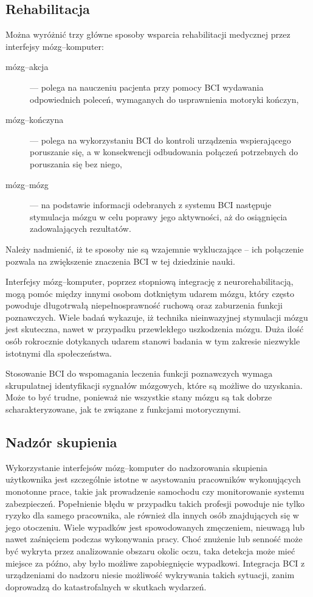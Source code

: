 \documentclass[skorowidz,skroty]{dyplomWEZUT}
\begin{document}
\subsection{Rehabilitacja}
Można wyróżnić trzy główne sposoby wsparcia rehabilitacji medycznej przez interfejsy mózg--komputer\cite{bci_lab}:
\begin{description}
    \item [mózg--akcja] --- polega na nauczeniu pacjenta przy pomocy BCI wydawania odpowiednich poleceń, wymaganych do usprawnienia motoryki kończyn,
    \item [mózg--kończyna] --- polega na wykorzystaniu BCI do kontroli urządzenia wspierającego poruszanie się, a w konsekwencji odbudowania połączeń potrzebnych do poruszania się bez niego,
    \item [mózg--mózg] --- na podstawie informacji odebranych z systemu BCI następuje stymulacja mózgu w celu poprawy jego aktywności, aż do osiągnięcia zadowalających rezultatów.
\end{description}
Należy nadmienić, iż te sposoby nie są wzajemnie wykluczające -- ich połączenie pozwala na zwiększenie znaczenia BCI w tej dziedzinie nauki.

Interfejsy mózg--komputer, poprzez stopniową integrację z neurorehabilitacją, mogą pomóc między innymi osobom dotkniętym udarem mózgu, który często powoduje długotrwałą niepełnosprawność ruchową oraz zaburzenia funkcji poznawczych. Wiele badań wykazuje, iż technika nieinwazyjnej stymulacji mózgu jest skuteczna, nawet w przypadku przewlekłego uszkodzenia mózgu\cite{bci_lab}. Duża ilość osób rokrocznie dotykanych udarem stanowi badania w tym zakresie niezwykle istotnymi dla społeczeństwa.

Stosowanie BCI do wspomagania leczenia funkcji poznawczych wymaga skrupulatnej identyfikacji sygnałów mózgowych, które są możliwe do uzyskania. Może to być trudne, ponieważ nie wszystkie stany mózgu są tak dobrze scharakteryzowane, jak te związane z funkcjami motorycznymi\cite{bci_handbook}.


\subsection{Nadzór skupienia}
Wykorzystanie interfejsów mózg--komputer do nadzorowania skupienia użytkownika jest szczególnie istotne w asystowaniu pracowników wykonujących monotonne prace, takie jak prowadzenie samochodu czy monitorowanie systemu zabezpieczeń. Popełnienie błędu w przypadku takich profesji powoduje nie tylko ryzyko dla samego pracownika, ale również dla innych osób znajdujących się w jego otoczeniu. Wiele wypadków jest spowodowanych zmęczeniem, nieuwagą lub nawet zaśnięciem podczas wykonywania pracy. Choć znużenie lub senność może być wykryta przez analizowanie obszaru okolic oczu, taka detekcja może mieć miejsce za późno, aby było możliwe zapobiegnięcie wypadkowi. Integracja BCI z urządzeniami do nadzoru niesie możliwość wykrywania takich sytuacji, zanim doprowadzą do katastrofalnych w skutkach wydarzeń. 
\end{document}
